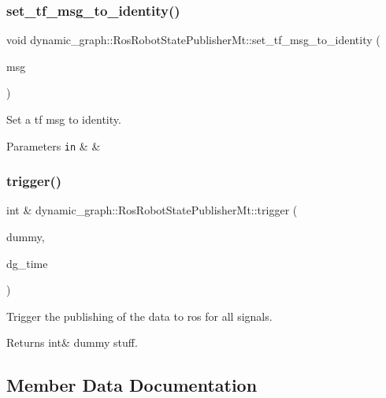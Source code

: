 \subsubsection{\texorpdfstring{set\+\_\+tf\+\_\+msg\+\_\+to\+\_\+identity()}{set\_tf\_msg\_to\_identity()}}
{\footnotesize\ttfamily void dynamic\+\_\+graph\+::\+Ros\+Robot\+State\+Publisher\+Mt\+::set\+\_\+tf\+\_\+msg\+\_\+to\+\_\+identity (\begin{DoxyParamCaption}\item[{geometry\+\_\+msgs\+::\+Transform\+Stamped \&}]{msg }\end{DoxyParamCaption})\hspace{0.3cm}{\ttfamily [private]}}



Set a tf msg to identity. 


\begin{DoxyParams}[1]{Parameters}
\mbox{\tt in}  & {\em } & \\
\hline
\end{DoxyParams}
\mbox{\label{classdynamic__graph_1_1RosRobotStatePublisherMt_ab246d4672cb6ccf5d0733dae31c5adbf}} 
\subsubsection{\texorpdfstring{trigger()}{trigger()}}
{\footnotesize\ttfamily int \& dynamic\+\_\+graph\+::\+Ros\+Robot\+State\+Publisher\+Mt\+::trigger (\begin{DoxyParamCaption}\item[{int \&}]{dummy,  }\item[{int}]{dg\+\_\+time }\end{DoxyParamCaption})}



Trigger the publishing of the data to ros for all signals. 

\begin{DoxyReturn}{Returns}
int\& dummy stuff. 
\end{DoxyReturn}


\subsection{Member Data Documentation}
\mbox{\label{classdynamic__graph_1_1RosRobotStatePublisherMt_a0ff7fbacd021e14f3abcae8dbd5c4ec0}} 

